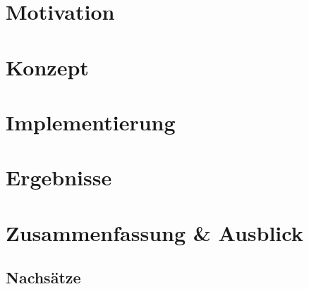 \documentclass[a4paper,
               final,
               draft,
               11pt]{book}
\begin{document}

\chapter{Motivation}


\chapter{Konzept}


\chapter{Implementierung}



\chapter{Ergebnisse}


\chapter{Zusammenfassung \& Ausblick}


\begin{appendix}

\chapter{Nachsätze}


\end{appendix}

\backmatter

\printindex

\begin{sloppypar}
	\printbibliography
\end{sloppypar}
\end{document}
